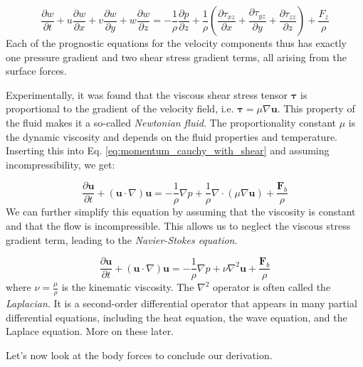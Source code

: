 \documentclass[12pt]{article}
\numberwithin{equation}{section}
\numberwithin{figure}{section}
\numberwithin{table}{section}
\begin{document}
\begin{equation}
  \frac{\partial w}{\partial t} + 
  u \frac{\partial w}{\partial x} + 
  v \frac{\partial w}{\partial y} + 
  w \frac{\partial w}{\partial z} = 
  - \frac{1}{\rho} \frac{\partial p}{\partial z} + 
  \frac{1}{\rho} \left( \frac{\partial \tau_{xz}}{\partial x} + \frac{\partial \tau_{yz}}{\partial y} + \frac{\partial \tau_{zz}}{\partial z} \right) + 
  \frac{F_z}{\rho}
\end{equation}
Each of the prognostic equations for the velocity components thus has exactly
one pressure gradient and two shear stress gradient terms, all arising from the
surface forces.

Experimentally, it was found that the viscous shear stress tensor $\boldsymbol{\tau}$
is proportional to the gradient of the velocity field, i.e. $\boldsymbol{\tau} = \mu \nabla \mathbf{u}$.
This property of the fluid makes it a so-called \textit{Newtonian fluid}.
The proportionality constant $\mu$ is the dynamic viscosity and depends on the
fluid properties and temperature.
Inserting this into Eq. \ref{eq:momentum_cauchy_with_shear} and assuming
incompressibility, we get:

\begin{equation}
  \frac{\partial \mathbf{u}}{\partial t} + (\mathbf{u} \cdot \nabla) \mathbf{u} =
  - \frac{1}{\rho} \nabla p + \frac{1}{\rho} \nabla \cdot (\mu \nabla \mathbf{u}) +
  \frac{\mathbf{F}_b}{\rho}
\end{equation}
We can further simplify this equation by assuming that the viscosity is constant
and that the flow is incompressible.
This allows us to neglect the viscous stress gradient term, leading to the
\textit{Navier-Stokes equation}.

\begin{equation}
  \frac{\partial \mathbf{u}}{\partial t} + (\mathbf{u} \cdot \nabla) \mathbf{u} =
  - \frac{1}{\rho} \nabla p + \nu \nabla^2 \mathbf{u} +
  \frac{\mathbf{F}_b}{\rho}
  \label{eq:momentum_navier_stokes}
\end{equation}
where $\nu = \frac{\mu}{\rho}$ is the kinematic viscosity.
The $\nabla^2$ operator is often called the \textit{Laplacian}.
It is a second-order differential operator that appears in many partial
differential equations, including the heat equation, the wave equation, and
the Laplace equation.
More on these later.

Let's now look at the body forces to conclude our derivation.
\end{document}
